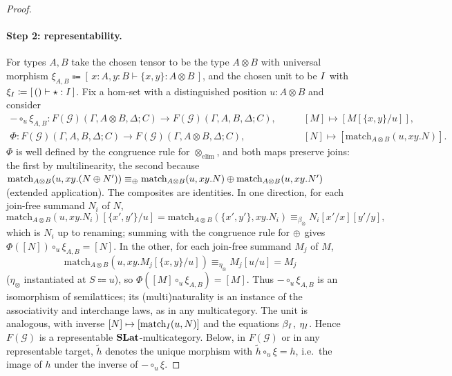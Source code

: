 \begin{proof}
\paragraph{Step 2: representability.}
For types $A, B$ take the chosen tensor to be the type $A \otimes B$ with universal morphism $\xi_{A,B} \Coloneqq [\, x : A, y : B \vdash \{x, y\} : A \otimes B \,]$, and the chosen unit to be $I$ with $\xi_{I} \mathrel{\vcentcolon\mathrel{\mkern-1.2mu}=} [\, () \vdash \star : I \,]$.
Fix a hom-set with a distinguished position $u : A \otimes B$ and consider
\begin{align*}
- \circ_{u} \xi_{A,B} : F(\mathcal{G})(\Gamma, A \otimes B, \Delta; C) \to F(\mathcal{G})(\Gamma, A, B, \Delta; C), &\qquad [M] \mapsto [M[\{x,y\}/u]],\\
\Phi : F(\mathcal{G})(\Gamma, A, B, \Delta; C) \to F(\mathcal{G})(\Gamma, A \otimes B, \Delta; C), &\qquad [N] \mapsto [\text{match}_{A \otimes B}(u, xy.N)].
\end{align*}
$\Phi$ is well defined by the congruence rule for $\otimes_{\text{elim}}$, and both maps preserve joins: the first by multilinearity, the second because $\text{match}_{A \otimes B}(u, xy.(N \mathbin{\oplus} N')) \equiv_{\mathbin{\oplus}} \text{match}_{A \otimes B}(u, xy.N) \mathbin{\oplus} \text{match}_{A \otimes B}(u, xy.N')$ (extended application).
The composites are identities.
In one direction, for each join-free summand $N_i$ of $N$,
\[
\text{match}_{A \otimes B}(u, xy.N_i)[\{x',y'\}/u] = \text{match}_{A \otimes B}(\{x',y'\}, xy.N_i) \equiv_{\beta_{\otimes}} N_i[x'/x][y'/y],
\]
which is $N_i$ up to renaming; summing with the congruence rule for $\mathbin{\oplus}$ gives $\Phi([N]) \circ_u \xi_{A,B} = [N]$.
In the other, for each join-free summand $M_j$ of $M$,
\[
\text{match}_{A \otimes B}(u, xy.M_j[\{x,y\}/u]) \equiv_{\eta_{\otimes}} M_j[u/u] = M_j
\]
($\eta_{\otimes}$ instantiated at $S \Coloneqq u$), so $\Phi([M] \circ_u \xi_{A,B}) = [M]$.
Thus $- \circ_u \xi_{A,B}$ is an isomorphism of semilattices; its (multi)naturality is an instance of the associativity and interchange laws, as in any multicategory.
The unit is analogous, with inverse $[N] \mapsto [\text{match}_{I}(u, N)]$ and the equations $\beta_{I}$, $\eta_{I}$.
Hence $F(\mathcal{G})$ is a representable $\mathbf{SLat}$-multicategory.
Below, in $F(\mathcal{G})$ or in any representable target, $\widetilde{h}$ denotes the unique morphism with $\widetilde{h} \circ_u \xi = h$, i.e.\ the image of $h$ under the inverse of $- \circ_u \xi$.


\end{proof}
